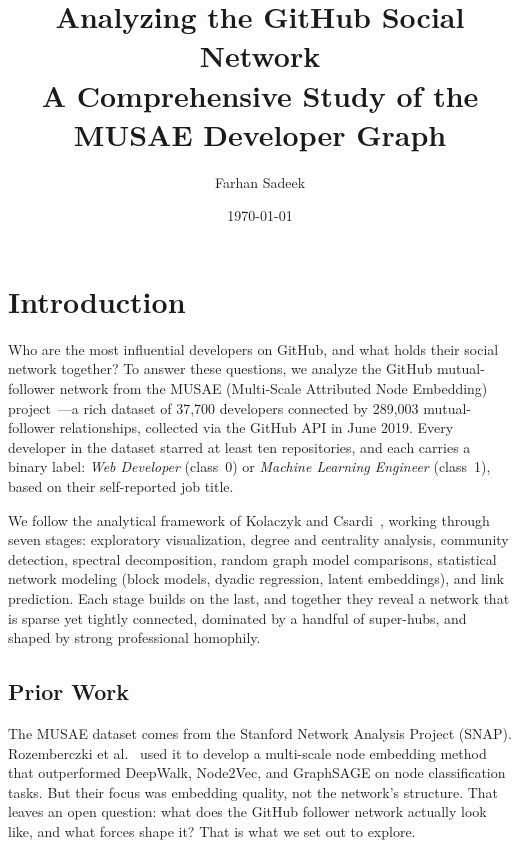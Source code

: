 \documentclass[letterpaper]{article}
\begin{document}
\title{\textbf{Analyzing the GitHub Social Network} \\ \Large A Comprehensive Study of the MUSAE Developer Graph}
\author{Farhan Sadeek}
\date{\today}

\maketitle
\tableofcontents
\newpage

\section{Introduction}

Who are the most influential developers on GitHub, and what holds their social network together? To answer these questions, we analyze the GitHub mutual-follower network from the MUSAE (Multi-Scale Attributed Node Embedding) project~\cite{rozemberczki2021musae}---a rich dataset of 37,700 developers connected by 289,003 mutual-follower relationships, collected via the GitHub API in June 2019. Every developer in the dataset starred at least ten repositories, and each carries a binary label: \emph{Web Developer} (class~0) or \emph{Machine Learning Engineer} (class~1), based on their self-reported job title.

We follow the analytical framework of Kolaczyk and Csardi~\cite{kolaczyk2020sand}, working through seven stages: exploratory visualization, degree and centrality analysis, community detection, spectral decomposition, random graph model comparisons, statistical network modeling (block models, dyadic regression, latent embeddings), and link prediction. Each stage builds on the last, and together they reveal a network that is sparse yet tightly connected, dominated by a handful of super-hubs, and shaped by strong professional homophily.

\subsection{Prior Work}

The MUSAE dataset comes from the Stanford Network Analysis Project (SNAP). Rozemberczki et al.~\cite{rozemberczki2021musae} used it to develop a multi-scale node embedding method that outperformed DeepWalk, Node2Vec, and GraphSAGE on node classification tasks. But their focus was embedding quality, not the network's structure. That leaves an open question: what does the GitHub follower network actually look like, and what forces shape it? That is what we set out to explore.
\end{document}
